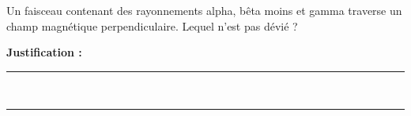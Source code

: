 Un faisceau contenant des rayonnements alpha, bêta moins et gamma traverse un champ magnétique perpendiculaire. Lequel n'est pas dévié ?

\choices

\noindent\textbf{Justification :} \hrulefill \\[2.5ex]
\rule{\linewidth}{0.4pt} \\[2.5ex]
\rule{\linewidth}{0.4pt}
\vfill
